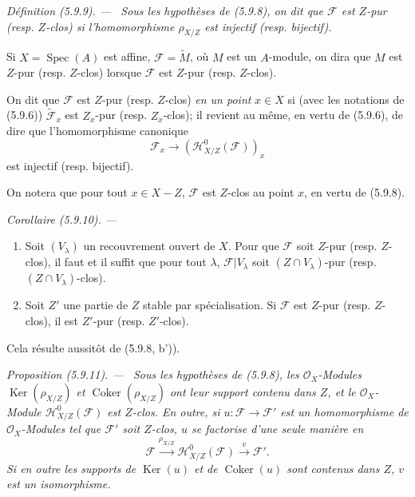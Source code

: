 \documentclass[10pt,oneside]{book}
\newenvironment{definition}[1][]{%
  \par\medskip\noindent\itshape Définition (#1). ---\ }{\par}
\newenvironment{proposition}[1][]{%
  \par\medskip\noindent\itshape Proposition (#1). ---\ }{\par}
\newenvironment{corollary}[1][]{%
  \par\medskip\noindent\itshape Corollaire (#1). ---\ }{\par}
\begin{document}
\begin{definition}[5.9.9]
\label{IV.2.s5.9.9-fr}
Sous les hypothèses de (5.9.8), on dit que $\mathcal F$ est $Z$-pur
(resp. $Z$-clos) si l'homomorphisme $\rho_{X/Z}$ est injectif
(resp. bijectif).
\end{definition}

Si $X=\operatorname{Spec}(A)$ est affine, $\mathcal F=\widetilde M$, où
$M$ est un $A$-module, on dira que $M$ est $Z$-pur (resp. $Z$-clos) lorsque
$\mathcal F$ est $Z$-pur (resp. $Z$-clos).

On dit que $\mathcal F$ est $Z$-pur (resp. $Z$-clos) \emph{en un point}
$x\in X$ si (avec les notations de (5.9.6)) $\widetilde{\mathcal F}_x$ est
$Z_x$-pur (resp. $Z_x$-clos); il revient au même, en vertu de (5.9.6), de
dire que l'homomorphisme canonique
\[
\mathcal F_x\longrightarrow(\mathcal H^0_{X/Z}(\mathcal F))_x
\]
est injectif (resp. bijectif).

On notera que pour tout $x\in X-Z$, $\mathcal F$ est $Z$-clos au point $x$,
en vertu de (5.9.8).

\begin{corollary}[5.9.10]
\label{IV.2.s5.9.10-fr}
\begin{enumerate}
\item[(i)] Soit $(V_\lambda)$ un recouvrement ouvert de $X$. Pour que
$\mathcal F$ soit $Z$-pur (resp. $Z$-clos), il faut et il suffit que pour
tout $\lambda$, $\mathcal F|V_\lambda$ soit $(Z\cap V_\lambda)$-pur
(resp. $(Z\cap V_\lambda)$-clos).
\item[(ii)] Soit $Z'$ une partie de $Z$ stable par spécialisation. Si
$\mathcal F$ est $Z$-pur (resp. $Z$-clos), il est $Z'$-pur
(resp. $Z'$-clos).
\end{enumerate}
\end{corollary}

Cela résulte aussitôt de (5.9.8, b')).

\begin{proposition}[5.9.11]
\label{IV.2.s5.9.11-fr}
Sous les hypothèses de (5.9.8), les $\mathcal O_X$-Modules
$\operatorname{Ker}(\rho_{X/Z})$ et $\operatorname{Coker}(\rho_{X/Z})$ ont
leur support contenu dans $Z$, et le $\mathcal O_X$-Module
$\mathcal H^0_{X/Z}(\mathcal F)$ est $Z$-clos. En outre, si
$u:\mathcal F\to\mathcal F'$ est un homomorphisme de
$\mathcal O_X$-Modules tel que $\mathcal F'$ soit $Z$-clos, $u$ se factorise
d'une seule manière en
\[
\mathcal F\xrightarrow{\rho_{X/Z}}\mathcal H^0_{X/Z}(\mathcal F)
\xrightarrow{v}\mathcal F'.
\]
Si en outre les supports de $\operatorname{Ker}(u)$ et de
$\operatorname{Coker}(u)$ sont contenus dans $Z$, $v$ est un isomorphisme.
\end{proposition}
\end{document}
